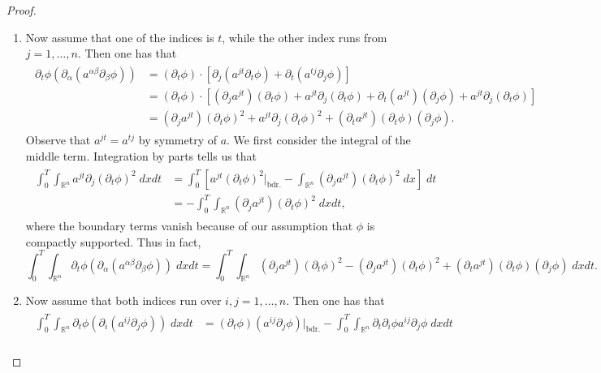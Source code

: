 \documentclass{article}
\numberwithin{equation}{section}
\begin{document}
\begin{proof}
\begin{enumerate}[itemsep =-2pt,label = (\arabic{*})]
			\item Now assume that one of the indices is $t$, while the other index runs from $j = 1, \ldots, n$. Then one has that 
			\begin{align*}
				\begin{split}
					\partial_{t}\phi(\partial_{\alpha}(a^{\alpha\beta}\partial_{\beta}\phi)) &= (\partial_{t}\phi) \cdot \left[\partial_{j}(a^{jt}\partial_{t}\phi) + \partial_{t}(a^{tj}\partial_{j}\phi)\right] \\
					&= (\partial_{t}\phi) \cdot \left[(\partial_{j}a^{jt})(\partial_{t}\phi) + a^{jt}\partial_{j}(\partial_{t}\phi) + \partial_{t}(a^{jt})(\partial_{j}\phi) + a^{jt}\partial_{j}(\partial_{t}\phi)\right] \\
					&= (\partial_{j}a^{jt})(\partial_{t}\phi)^{2} + a^{jt}\partial_{j}(\partial_{t}\phi)^{2} + (\partial_{t}a^{jt})(\partial_{t}\phi)(\partial_{j}\phi). 
				\end{split}
			\end{align*}
			Observe that $a^{jt} = a^{tj}$ by symmetry of $a$. We first consider the integral of the middle term. Integration by parts tells us that 
			\begin{align*}
				\begin{split}
					\int_{0}^{T}\int_{\mathbb{R}^{n}}a^{jt}\partial_{j}(\partial_{t}\phi)^{2}\;dx dt &= \int_{0}^{T} \left[a^{jt}(\partial_{t}\phi)^{2}|_{\text{bdr.}} - \int_{\mathbb{R}^{n}}(\partial_{j}a^{jt})(\partial_{t}\phi)^{2}\;dx\right]\;dt \\
					&= -\int_{0}^{T}\int_{\mathbb{R}^{n}}(\partial_{j}a^{jt})(\partial_{t}\phi)^{2}\;dxdt, 
				\end{split}
			\end{align*}
			where the boundary terms vanish because of our assumption that $\phi$ is compactly supported. Thus in fact, 
			\begin{equation*}
				\int_{0}^{T}\int_{\mathbb{R}^{n}}\partial_{t}\phi(\partial_{\alpha}(a^{\alpha\beta}\partial_{\beta}\phi))\;dxdt = \int_{0}^{T}\int_{\mathbb{R}^{n}}(\partial_{j}a^{jt})(\partial_{t}\phi)^{2} - (\partial_{j}a^{jt})(\partial_{t}\phi)^{2} + (\partial_{t}a^{jt})(\partial_{t}\phi)(\partial_{j}\phi)\;dx dt. 
			\end{equation*}
			\item Now assume that both indices run over $i, j = 1, \ldots, n$. Then one has that  
			\begin{align*}
				\begin{split}
					\int_{0}^{T}\int_{\mathbb{R}^{n}}\partial_{t}\phi (\partial_{i}(a^{ij}\partial_{j}\phi))\;dxdt &= (\partial_{t}\phi)(a^{ij}\partial_{j}\phi)\bigg|_{\text{bdr.}} - \int_{0}^{T}\int_{\mathbb{R}^{n}}\partial_{t}\partial_{i}\phi a^{ij}\partial_{j}\phi\;dx dt \\

\end{split}
\end{align*}
\end{enumerate}
\end{proof}
\end{document}
